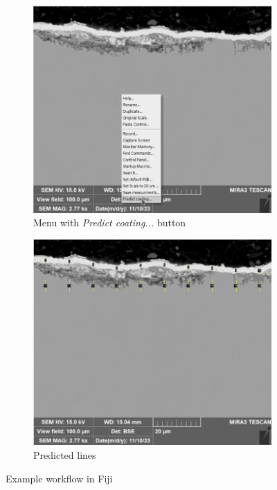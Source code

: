 \begin{figure}[H]
    \centering
    \begin{subfigure}{0.45\textwidth}
        \centering
        \includegraphics[width=\linewidth]{PICTURES/fiji/frame-002.png}
        \caption{Menu with \textit{Predict coating...} button}
        \label{fig:enter-label-2}
    \end{subfigure}
    \begin{subfigure}{0.45\textwidth}
        \centering
        \includegraphics[width=\linewidth]{PICTURES/fiji/frame-003.png}
        \caption{Predicted lines}
        \label{fig:enter-label-3}
    \end{subfigure}
    \caption{Example workflow in Fiji}
    \label{fig:two-masks}
\end{figure}
